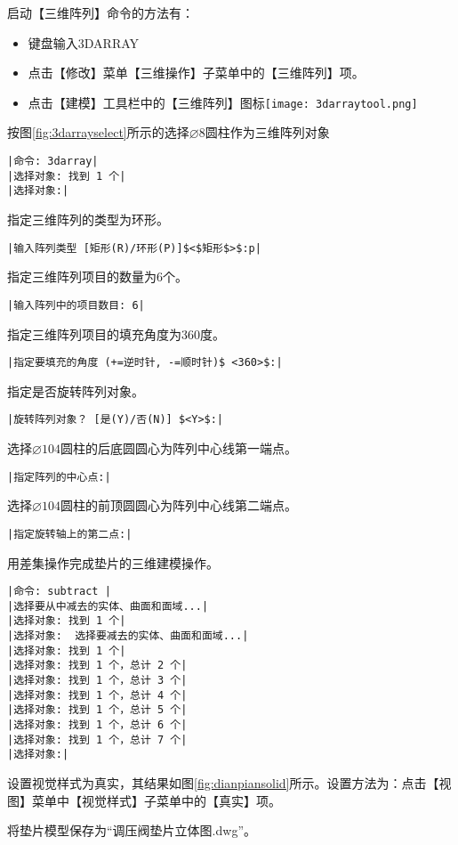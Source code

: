 \begin{procedure}
启动【三维阵列】命令的方法有：
\begin{itemize}
\item 键盘输入3DARRAY
\item 点击【修改】菜单【三维操作】子菜单中的【三维阵列】项。
\item 点击【建模】工具栏中的【三维阵列】图标\texttt{[image: 3darraytool.png]}
\end{itemize}

按图\ref{fig:3darrayselect}所示的选择$\diameter 8$圆柱作为三维阵列对象
\begin{lstlisting}
|命令: 3darray|
|选择对象: 找到 1 个|
|选择对象:|
\end{lstlisting}
指定三维阵列的类型为环形。
\begin{lstlisting}
|输入阵列类型 [矩形(R)/环形(P)]$<$矩形$>$:p|
\end{lstlisting}
指定三维阵列项目的数量为6个。
\begin{lstlisting}
|输入阵列中的项目数目: 6|
\end{lstlisting}
指定三维阵列项目的填充角度为360度。
\begin{lstlisting}
|指定要填充的角度 (+=逆时针, -=顺时针)$ <360>$:|
\end{lstlisting}
指定是否旋转阵列对象。
\begin{lstlisting}
|旋转阵列对象？ [是(Y)/否(N)] $<Y>$:|
\end{lstlisting}
选择$\diameter 104$圆柱的后底圆圆心为阵列中心线第一端点。
\begin{lstlisting}
|指定阵列的中心点:|
\end{lstlisting}
选择$\diameter 104$圆柱的前顶圆圆心为阵列中心线第二端点。
\begin{lstlisting}
|指定旋转轴上的第二点:|
\end{lstlisting}
\item 用差集操作完成垫片的三维建模操作。
\begin{lstlisting}
|命令: subtract |
|选择要从中减去的实体、曲面和面域...|
|选择对象: 找到 1 个|
|选择对象:  选择要减去的实体、曲面和面域...|
|选择对象: 找到 1 个|
|选择对象: 找到 1 个，总计 2 个|
|选择对象: 找到 1 个，总计 3 个|
|选择对象: 找到 1 个，总计 4 个|
|选择对象: 找到 1 个，总计 5 个|
|选择对象: 找到 1 个，总计 6 个|
|选择对象: 找到 1 个，总计 7 个|
|选择对象:|
\end{lstlisting}
\item 设置视觉样式为真实，其结果如图\ref{fig:dianpiansolid}所示。设置方法为：点击【视图】菜单中【视觉样式】子菜单中的【真实】项。
\item 将垫片模型保存为“调压阀垫片立体图.dwg”。
\end{procedure}